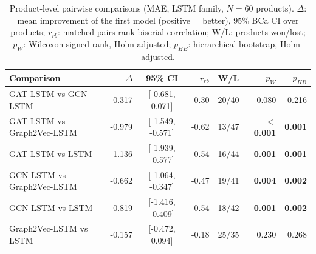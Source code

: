 \begin{table}[ht]
\centering\small
\caption{Product-level pairwise comparisons (MAE, LSTM family, $N=60$ products). $\Delta$: mean improvement of the first model (positive = better), 95\% BCa CI over products; $r_{rb}$: matched-pairs rank-biserial correlation; W/L: products won/lost; $p_{W}$: Wilcoxon signed-rank, Holm-adjusted; $p_{HB}$: hierarchical bootstrap, Holm-adjusted.}
\label{tab:pairwise_mae_lstm}
\begin{tabular}{lrcrcrr}
\toprule
Comparison & $\Delta$ & 95\% CI & $r_{rb}$ & W/L & $p_{W}$ & $p_{HB}$ \\
\midrule
GAT-LSTM vs GCN-LSTM & -0.317 & [-0.681, 0.071] & -0.30 & 20/40 & 0.080 & 0.216 \\
GAT-LSTM vs Graph2Vec-LSTM & -0.979 & [-1.549, -0.571] & -0.62 & 13/47 & \textbf{$<$0.001} & \textbf{0.001} \\
GAT-LSTM vs LSTM & -1.136 & [-1.939, -0.577] & -0.54 & 16/44 & \textbf{0.001} & \textbf{0.001} \\
GCN-LSTM vs Graph2Vec-LSTM & -0.662 & [-1.064, -0.347] & -0.47 & 19/41 & \textbf{0.004} & \textbf{0.002} \\
GCN-LSTM vs LSTM & -0.819 & [-1.416, -0.409] & -0.54 & 18/42 & \textbf{0.001} & \textbf{0.002} \\
Graph2Vec-LSTM vs LSTM & -0.157 & [-0.472, 0.094] & -0.18 & 25/35 & 0.230 & 0.268 \\
\bottomrule
\end{tabular}
\end{table}
